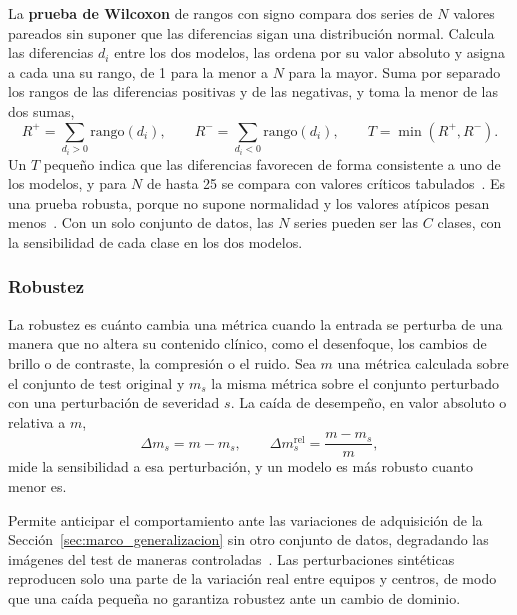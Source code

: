 La \textbf{prueba de Wilcoxon} de rangos con signo compara dos series de $N$ valores pareados sin suponer que
las diferencias sigan una distribución normal. Calcula las diferencias $d_i$ entre los dos modelos, las ordena
por su valor absoluto y asigna a cada una su rango, de 1 para la menor a $N$ para la mayor. Suma por separado
los rangos de las diferencias positivas y de las negativas, y toma la menor de las dos sumas,
\begin{equation}
    R^{+} = \sum_{d_i > 0} \mathrm{rango}(d_i), \qquad
    R^{-} = \sum_{d_i < 0} \mathrm{rango}(d_i), \qquad
    T = \min\left(R^{+}, R^{-}\right).
    \label{eq:marco_wilcoxon}
\end{equation}
Un $T$ pequeño indica que las diferencias favorecen de forma consistente a uno de los modelos, y para $N$ de
hasta 25 se compara con valores críticos tabulados~\cite{wilcoxon1945individual,demsar2006statistical}. Es
una prueba robusta, porque no supone normalidad y los valores atípicos pesan menos~\cite{demsar2006statistical}.
Con un solo conjunto de datos, las $N$ series pueden ser las $C$ clases, con la sensibilidad de cada clase en
los dos modelos.

\subsubsection{Robustez}
\label{sec:marco_eval_robustez}

\begingroup La robustez es cuánto cambia una métrica cuando la entrada se perturba de una manera que no altera su
contenido clínico, como el desenfoque, los cambios de brillo o de contraste, la compresión o el ruido. Sea $m$
una métrica calculada sobre el conjunto de test original y $m_s$ la misma métrica sobre el conjunto perturbado
con una perturbación de severidad $s$. La caída de desempeño, en valor absoluto o relativa a $m$,
\begin{equation}
    \Delta m_s = m - m_s, \qquad
    \Delta m_s^{\text{rel}} = \frac{m - m_s}{m},
    \label{eq:marco_robustez}
\end{equation}
mide la sensibilidad a esa perturbación, y un modelo es más robusto cuanto menor es.\par\endgroup

Permite anticipar el comportamiento ante las variaciones de adquisición de la
Sección~\ref{sec:marco_generalizacion} sin otro conjunto de datos, degradando las imágenes del test de
maneras controladas~\cite{hendrycks2019benchmarking}. Las perturbaciones sintéticas reproducen solo una parte
de la variación real entre equipos y centros, de modo que una caída pequeña no garantiza robustez ante un
cambio de dominio.

